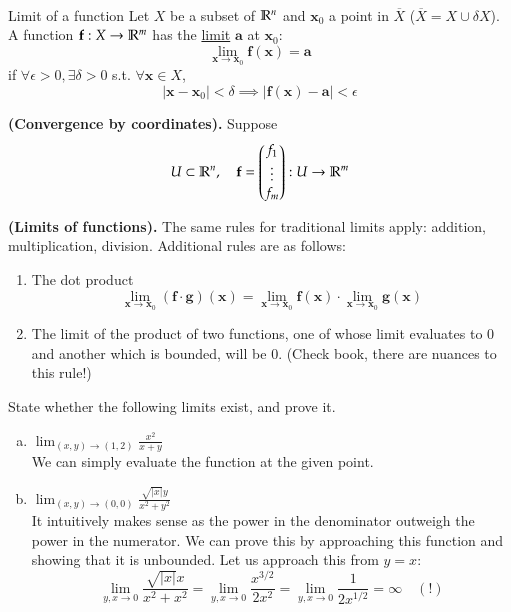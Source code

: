 \\

\begin{defn}{Limit of a function}
Let $X$ be a subset of $\mathbb{R}^n$ and $\bm{x}_0$ a point in $\overline{X}$ ($\overline{X}=X\cup \delta X$). A function $\textbf{f} : X \rightarrow \mathbb{R}^m$ has the \ul{limit}
 $\bm{a}$ at $\bm{x}_0$:
\[\lim_{\bm{x}\rightarrow \bm{x}_0}\bm{f}(\bm{x}) = \bm{a}\]
if $\forall \epsilon > 0, \exists\delta > 0$ s.t. $\forall\bm{x}\in X$,
\[|\bm{x}-\bm{x}_0|<\delta \implies |\bm{f}(\bm{x})-\bm{a}|<\epsilon\]
\end{defn}

\begin{proposition}
\textbf{(Convergence by coordinates).} Suppose
\[U\subset \mathbb{R}^n, \quad \textbf{f}=\begin{pmatrix} f_1 \\ \vdots \\ f_m \end{pmatrix}: U\rightarrow \mathbb{R}^m\]
\end{proposition}

\begin{theorem}
  \textbf{(Limits of functions).} The same rules for traditional limits apply: addition, multiplication, division. Additional rules are as follows:
  \begin{enumerate}
    \item The dot product
    \[\lim_{\bm{x}\to\bm{x}_0}(\bm{f} \cdot \bm{g})(\bm{x})=\lim_{\bm{x}\to\bm{x}_0}\bm{f}(\bm{x})\cdot \lim_{\bm{x}\to\bm{x}_0}\bm{g}(\bm{x})\]
    \item The limit of the product of two functions, one of whose limit evaluates to $0$ and another which is bounded, will be $0$. (Check book, there are nuances to this rule!)
  \end{enumerate}
\end{theorem}

 State whether the following limits exist, and prove it.
\begin{enumerate}[a.]
  \item $\displaystyle \lim_{(x,y)\rightarrow (1,2)} \frac{x^2}{x+y}$\\
   We can simply evaluate the function at the given point. 
  
  \item $\displaystyle \lim_{(x,y)\rightarrow (0,0)} \frac{\sqrt{|x|}y}{x^2+y^2}$\\
   It intuitively makes sense as the power in the denominator outweigh the power in the numerator. We can prove this by approaching this function and showing that it is unbounded. Let us approach this from $y=x$: 
  \[\lim_{y,x\to 0}\frac{\sqrt{|x|}x}{x^2+x^2}=\lim_{y,x\to 0}\frac{x^{3/2}}{2x^2}=\lim_{y,x\to 0}\frac{1}{2x^{1/2}}=\infty\quad (!)\]

\end{enumerate}
